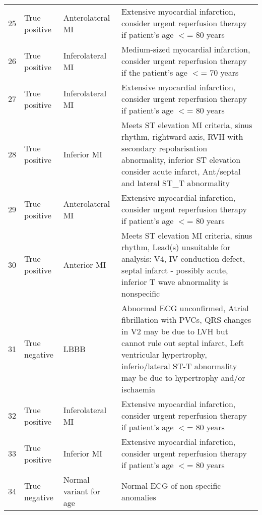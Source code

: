 \begin{longtable}[c]{Lp{0.18\textwidth}AA}
25&True positive&Anterolateral MI&Extensive myocardial infarction, consider urgent reperfusion therapy if patient's age $<$= 80 years \\
26&True positive&Inferolateral MI&Medium-sized myocardial infarction, consider urgent reperfusion therapy if the patient's age $<$= 70 years \\
27&True positive&Inferolateral MI&Extensive myocardial infarction, consider urgent reperfusion therapy if patient's age $<$= 80 years \\
28&True positive&Inferior MI&Meets ST elevation MI criteria, \newline  sinus rhythm, \newline  rightward axis, RVH with secondary repolarisation abnormality, \newline  inferior ST elevation consider acute infarct,  \newline  Ant\slash septal and lateral ST\_T abnormality \\
29&True positive&Anterolateral MI&Extensive myocardial infarction, consider urgent reperfusion therapy if patient's age $<$= 80 years \\
30&True positive&Anterior MI&Meets ST elevation MI criteria, \newline  sinus rhythm,  \newline  Lead(s) unsuitable for analysis: V4, IV conduction defect,  \newline  septal infarct - possibly acute,  \newline  inferior T wave abnormality is nonspecific \\
31&True negative&LBBB&Abnormal ECG unconfirmed,  \newline  Atrial fibrillation with PVCs,  \newline  QRS changes in V2 may be due to LVH but cannot rule out septal infarct,  \newline  Left ventricular hypertrophy,  \newline  inferio\slash lateral ST-T abnormality may be due to hypertrophy and\slash or ischaemia \\
32&True positive&Inferolateral MI&Extensive myocardial infarction, consider urgent reperfusion therapy if patient's age $<$= 80 years \\
33&True positive&Inferior MI&Extensive myocardial infarction, consider urgent reperfusion therapy if patient's age $<$= 80 years \\
34&True negative&Normal variant for age&Normal ECG of non-specific anomalies \\

\end{longtable}
